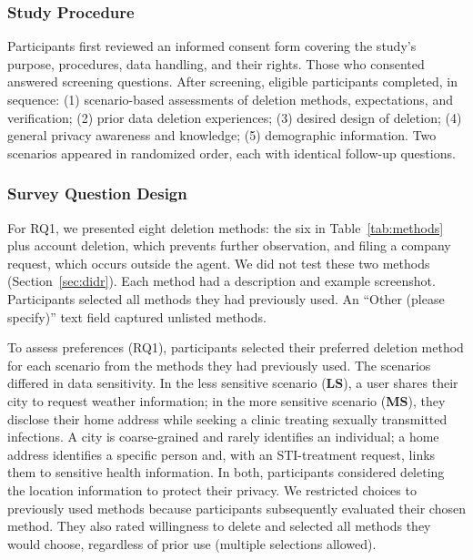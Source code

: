    \subsubsection{Study Procedure}
    Participants first reviewed an informed consent form covering the study's purpose, procedures, data handling, and their rights. 
    Those who consented answered screening questions.
    After screening, eligible participants completed, in sequence: (1) scenario-based assessments of deletion methods, expectations, and verification; (2) prior data deletion experiences; (3) desired design of deletion; (4) general privacy awareness and knowledge; %
    (5) demographic information.
    Two scenarios appeared in randomized order, each with identical follow-up questions. 



    \subsubsection{Survey Question Design}
    \label{subsubsec:questions}

    For RQ1, we presented eight deletion methods: the six in Table~\ref{tab:methods} plus account deletion, which prevents further observation, and filing a company request, which occurs outside the agent. We did not test these two methods (Section~\ref{sec:didr}).
    Each method had a description and example screenshot. 
    Participants selected all methods they had previously used.
    An “Other (please specify)” text field captured unlisted methods. 

    To assess preferences (RQ1), participants selected their preferred deletion method for each scenario from the methods they had previously used.
    The scenarios differed in data sensitivity.
    In the less sensitive scenario (\textbf{LS}), a user shares their city to request weather information; in the more sensitive scenario (\textbf{MS}), they disclose their home address while seeking a clinic treating sexually transmitted infections.
    A city is coarse-grained and rarely identifies an individual; a home address identifies a specific person and, with an STI-treatment request, links them to sensitive health information.
    In both, participants considered deleting the location information to protect their privacy. 
    We restricted choices to previously used methods because participants subsequently evaluated their chosen method.
    They also rated willingness to delete and selected all methods they would choose, regardless of prior use (multiple selections allowed).


